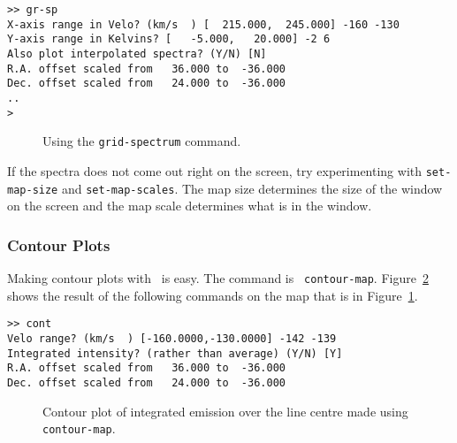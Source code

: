 \begin{verbatim}
>> gr-sp
X-axis range in Velo? (km/s  ) [  215.000,  245.000] -160 -130
Y-axis range in Kelvins? [   -5.000,   20.000] -2 6
Also plot interpolated spectra? (Y/N) [N]
R.A. offset scaled from   36.000 to  -36.000
Dec. offset scaled from   24.000 to  -36.000
..
>
\end{verbatim}

\begin{figure}[htb]
\centering
\leavevmode
\epsfysize=5in
\vspace*{-0.5cm}
\begin{center}
\begin{minipage}[t]{4.5in}
\caption[`Postage-stamp' (grid) spectrum plot]
{\small{Using the {\tt grid-spectrum} command.}
}
\label{fig:specx_fig6}
\end{minipage}
\end{center}
\end{figure}

If the spectra does not come out right on the screen, try
experimenting with {\tt set-map-size} and {\tt set-map-scales}.  The
map size determines the size of the window on the screen and the map
scale determines what is in the window.

\subsubsection{Contour Plots}
\label{sec:specx_13.4}
Making contour plots with \SPECX\ is easy.  The command is {\tt
contour-map}.  Figure~\ref{fig:specx_fig7} shows the result of the
following commands on the map that is in Figure~\ref{fig:specx_fig6}.

\begin{verbatim}
>> cont
Velo range? (km/s  ) [-160.0000,-130.0000] -142 -139
Integrated intensity? (rather than average) (Y/N) [Y]
R.A. offset scaled from   36.000 to  -36.000
Dec. offset scaled from   24.000 to  -36.000
\end{verbatim}

\begin{figure}[htb]
\centering
\leavevmode
\epsfysize=4in
\vspace*{-0.5cm}
\begin{center}
\begin{minipage}[t]{5in}
\caption[Contour plot example]
{\small{Contour plot of integrated emission over the line centre made
using {\tt contour-map}.}  }
\label{fig:specx_fig7}
\end{minipage}
\end{center}
\end{figure}

